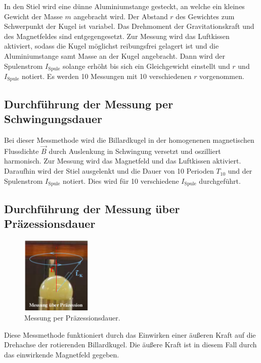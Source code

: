 In den Stiel wird eine dünne Aluminiumstange
gesteckt, an welche ein kleines Gewicht der Masse $m$ angebracht wird.
Der Abstand $r$ des Gewichtes zum Schwerpunkt der Kugel ist variabel.
Das Drehmoment der Gravitationskraft und des Magnetfeldes sind entgegengesetzt.
Zur Messung wird das Luftkissen aktiviert, sodass die Kugel möglichst
reibungsfrei gelagert ist und die Aluminiumstange samt Masse an der Kugel angebracht.
Dann wird der Spulenstrom $I_{\text{Spule}}$ solange erhöht bis sich ein Gleichgewicht einstellt und
$r$ und $I_{\text{Spule}}$ notiert. Es werden 10 Messungen mit 10 verschiedenen $r$ vorgenommen.

\newpage

\subsection{Durchführung der Messung per Schwingungsdauer}
\label{ssec:DurchSchw}

Bei dieser Messmethode wird die Billardkugel in der homogenenen magnetischen Flussdichte $\vec{B}$ durch
Auslenkung in Schwingung versetzt und oszilliert harmonisch. Zur Messung wird das Magnetfeld und das Luftkissen aktiviert.
Daraufhin wird der Stiel ausgelenkt und die Dauer von 10 Perioden $T_{10}$ und der Spulenstrom $I_{\text{Spule}}$ notiert.
Dies wird für 10 verschiedene $I_{\text{Spule}}$ durchgeführt.

\subsection{Durchführung der Messung über Präzessionsdauer}
\label{ssec:DurchPraez}

\begin{figure}
  \centering
  \includegraphics[width=0.3\textwidth]{content/images/bild4.pdf}
  \caption{Messung per Präzessionsdauer.}
  \label{fig:3}
\end{figure}
Diese Messmethode funktioniert durch das Einwirken einer
äußeren Kraft auf die Drehachse der rotierenden Billardkugel.
Die äußere Kraft ist in diesem Fall durch das
einwirkende Magnetfeld gegeben.




\newpage
